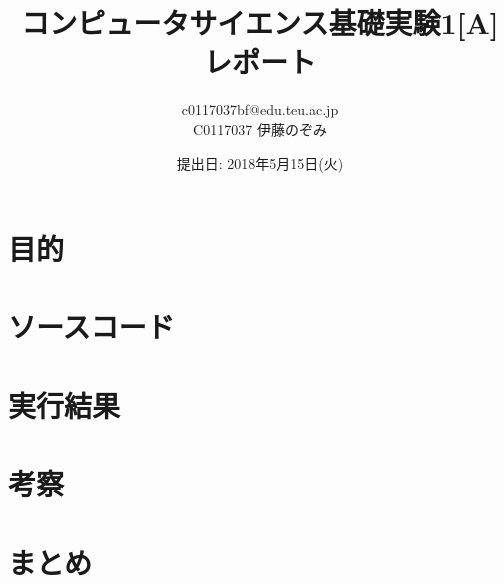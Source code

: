 \documentclass[uplatex]{jsarticle}
\begin{document}
\begin{titlepage}
  \title{コンピュータサイエンス基礎実験1[A] レポート}
  \date{提出日: 2018年5月15日(火)}
  \author{c0117037bf@edu.teu.ac.jp\\C0117037 伊藤のぞみ}
  \maketitle
  \thispagestyle{empty}
\end{titlepage}

\section{目的}

\section{ソースコード}
% 


\section{実行結果}

\section{考察}

\section{まとめ}

\end{document}
